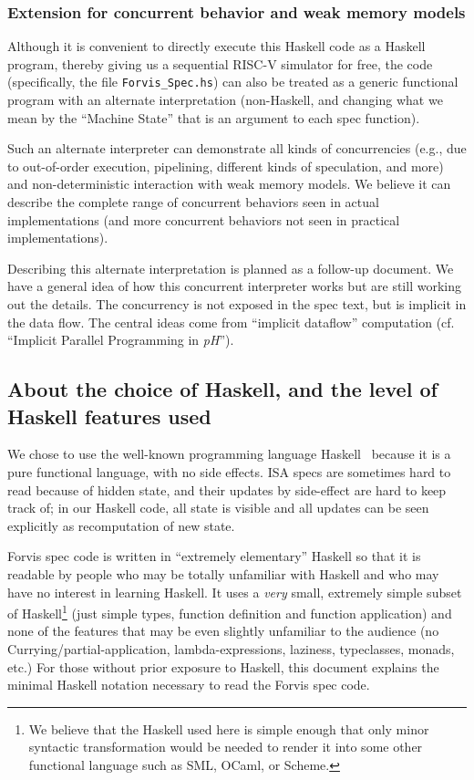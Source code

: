 \documentclass[11pt]{article}
\begin{document}
\subsubsection{Extension for concurrent behavior and weak memory models}

Although it is convenient to directly execute this Haskell code as a
Haskell program, thereby giving us a sequential RISC-V simulator for
free, the code (specifically, the file \verb|Forvis_Spec.hs|) can also
be treated as a generic functional program with an alternate
interpretation (non-Haskell, and changing what we mean by the
``Machine State'' that is an argument to each spec function).

Such an alternate interpreter can demonstrate all kinds of
concurrencies (e.g., due to out-of-order execution, pipelining,
different kinds of speculation, and more) and non-deterministic
interaction with weak memory models.  We believe it can describe the
complete range of concurrent behaviors seen in actual implementations
(and more concurrent behaviors not seen in practical implementations).

Describing this alternate interpretation is planned as a follow-up
document.  We have a general idea of how this concurrent interpreter
works but are still working out the details.  The concurrency is not
exposed in the spec text, but is implicit in the data flow.  The
central ideas come from ``implicit dataflow'' computation (cf.
``Implicit Parallel Programming in \emph{pH}''\cite{Nikhil2000a}).


\subsection{About the choice of Haskell, and the level of Haskell features used}

We chose to use the well-known programming language
Haskell~\cite{PeytonJones2003} because it is a pure functional
language, with no side effects.  ISA specs are sometimes hard to read
because of hidden state, and their updates by side-effect are hard to
keep track of; in our Haskell code, all state is visible and all
updates can be seen explicitly as recomputation of new state.

Forvis spec code is written in ``extremely elementary'' Haskell so
that it is readable by people who may be totally unfamiliar with
Haskell and who may have no interest in learning Haskell.  It uses a
\emph{very} small, extremely simple subset of Haskell\footnote{ We
believe that the Haskell used here is simple enough that only minor
syntactic transformation would be needed to render it into some other
functional language such as SML, OCaml, or Scheme.}  (just simple
types, function definition and function application) and none of the
features that may be even slightly unfamiliar to the audience (no
Currying/partial-application, lambda-expressions, laziness,
typeclasses, monads, etc.)  For those without prior exposure to
Haskell, this document explains the minimal Haskell notation necessary
to read the Forvis spec code.
\end{document}
